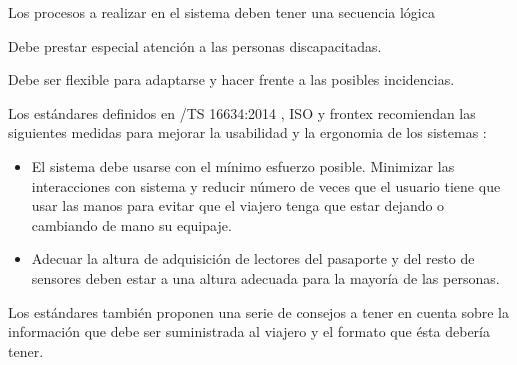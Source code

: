 Los procesos a realizar en el sistema deben tener una secuencia lógica 

Debe prestar especial atención a las personas discapacitadas.

Debe ser flexible para adaptarse y hacer frente a las posibles incidencias.

Los estándares definidos en /TS 16634:2014 \cite{CEN/TS16634:2014}, ISO \cite{ISO/Biometric} y \Gls{frontex} \cite{FRONTEX2016OpeReport} \cite{FRONTEX2016TechReport} recomiendan las siguientes medidas para mejorar la usabilidad y la \gls{ergonomia} de los sistemas :

\begin{itemize}
    \item
    El sistema debe usarse con el mínimo esfuerzo posible. Minimizar las interacciones con sistema y reducir número de veces que el usuario tiene que usar las manos para evitar que el viajero tenga que estar dejando o cambiando de mano su equipaje. 
    \item
    Adecuar la altura de adquisición de lectores del pasaporte y del resto de sensores deben estar a una altura adecuada para la mayoría de las personas.
\end{itemize}

Los estándares también proponen una serie de consejos a tener en cuenta sobre la información que debe ser suministrada al viajero y el formato que ésta debería tener.

